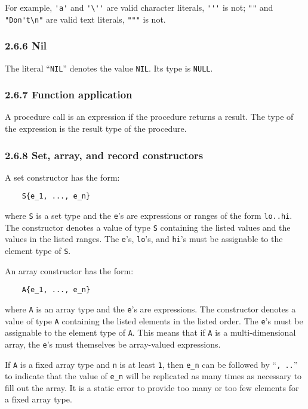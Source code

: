 \documentclass[10pt]{article}
\begin{document}
For example, \verb|'a'| and \verb|'\''| are valid character literals,
\verb|'''| is not; \verb|""| and \verb|"Don't\n"| are valid text literals,
\verb|"""| is not.

\subsubsection*{2.6.6 Nil}

The literal ``\verb|NIL|'' denotes the value \verb|NIL|.  Its type is
\verb|NULL|.

\subsubsection*{2.6.7 Function application}

A procedure call is an expression if the procedure returns a result.  The type
of the expression is the result type of the procedure.

\subsubsection*{2.6.8 Set, array, and record constructors}

A set constructor has the form:
\begin{verbatim}
    S{e_1, ..., e_n}
\end{verbatim}
where \verb|S| is a set type and the \verb|e|'s are expressions or ranges of
the form \verb|lo..hi|.  The constructor denotes a value of type \verb|S|
containing the listed values and the values in the listed ranges.  The
\verb|e|'s, \verb|lo|'s, and \verb|hi|'s must be assignable to the element
type of \verb|S|.

An array constructor has the form:
\begin{verbatim}
    A{e_1, ..., e_n}
\end{verbatim}
where \verb|A| is an array type and the \verb|e|'s are expressions.  The
constructor denotes a value of type \verb|A| containing the listed elements in
the listed order.  The \verb|e|'s must be assignable to the element type of
\verb|A|.  This means that if \verb|A| is a multi-dimensional array, the
\verb|e|'s must themselves be array-valued expressions.

If \verb|A| is a fixed array type and \verb|n| is at least \verb|1|, then
\verb|e_n| can be followed by ``\verb|, ..|'' to indicate that the value of
\verb|e_n| will be replicated as many times as necessary to fill out the
array.  It is a static error to provide too many or too few elements for a
fixed array type.
\end{document}
